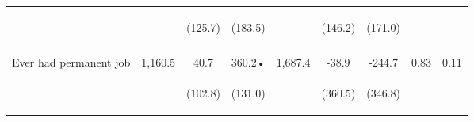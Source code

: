 \begin{table}[h!]
{\begin{tabular}{lcccccccc}
 & \begin{footnotesize}\end{footnotesize} & \begin{footnotesize}(125.7)\end{footnotesize} & \begin{footnotesize}(183.5)\end{footnotesize} & \begin{footnotesize}\end{footnotesize} & \begin{footnotesize}(146.2)\end{footnotesize} & \begin{footnotesize}(171.0)\end{footnotesize} & \begin{footnotesize}\end{footnotesize} & \begin{footnotesize}\end{footnotesize}\\
 & \begin{footnotesize}\end{footnotesize} & \begin{footnotesize}[1.000]\end{footnotesize} & \begin{footnotesize}[0.037]\end{footnotesize} & \begin{footnotesize}\end{footnotesize} & \begin{footnotesize}[1.000]\end{footnotesize} & \begin{footnotesize}[0.443]\end{footnotesize} & \begin{footnotesize}\end{footnotesize} & \begin{footnotesize}\end{footnotesize}\\
\noalign{\smallskip}Ever had permanent job & 1,160.5 & 40.7 & 360.2• & 1,687.4 & -38.9 & -244.7 & 0.83 & 0.11\\
 & \begin{footnotesize}\end{footnotesize} & \begin{footnotesize}(102.8)\end{footnotesize} & \begin{footnotesize}(131.0)\end{footnotesize} & \begin{footnotesize}\end{footnotesize} & \begin{footnotesize}(360.5)\end{footnotesize} & \begin{footnotesize}(346.8)\end{footnotesize} & \begin{footnotesize}\end{footnotesize} & \begin{footnotesize}\end{footnotesize}\\

\end{tabular}}
\end{table}
